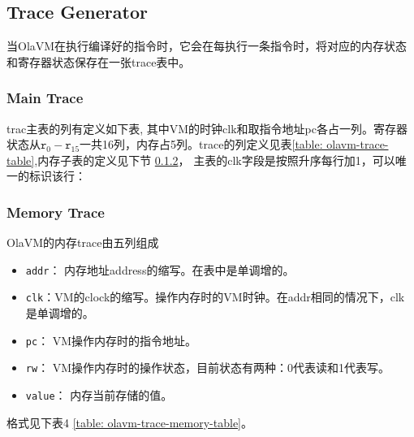 \subsection{Trace Generator}\label{subsec: : trace-generator}
当OlaVM在执行编译好的指令时，它会在每执行一条指令时，将对应的内存状态和寄存器状态保存在一张trace表中。
\subsubsection{Main Trace}\label{subsubsec: olavm-main-trace}
trac主表的列有定义如下表, 其中VM的时钟clk和取指令地址pc各占一列。寄存器状态从$\texttt{r}_0 - \texttt{r}_{15}$一共16列，内存占5列。trace的列定义见表\ref{table: olavm-trace-table},内存子表的定义见下节 \ref{subsubsec: olavm-trace-memory}，
主表的clk字段是按照升序每行加1，可以唯一的标识该行：
\begin{table}[!ht]
    \centering {}
    \caption{OlaVM的trace表结构}
    \label{table: olavm-trace-table}
\end{table}

\subsubsection{Memory Trace}\label{subsubsec: olavm-trace-memory}
OlaVM的内存trace由五列组成
\begin{itemize}
    \item \verb|addr|： 内存地址address的缩写。在表中是单调增的。
    \item \verb|clk|：VM的clock的缩写。操作内存时的VM时钟。在addr相同的情况下，clk是单调增的。
    \item \verb|pc|： VM操作内存时的指令地址。
    \item \verb|rw|： VM操作内存时的操作状态，目前状态有两种：0代表读和1代表写。
    \item \verb|value|： 内存当前存储的值。
\end{itemize}

格式见下表4 \ref{table: olavm-trace-memory-table}。

\begin{table}[!ht]
    \centering {}
    \caption{OlaVM的trace表结构}
    \label{table: olavm-trace-memory-table}
\end{table}

